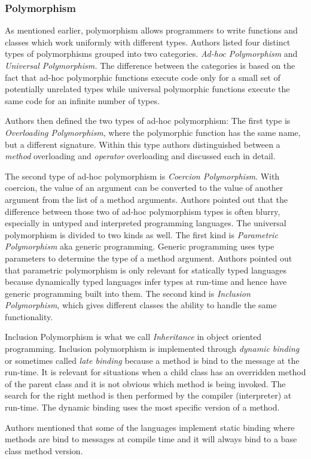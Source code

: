 \documentclass[12pt,twoside,a4paper]{report}
\begin{document}
\subsubsection{Polymorphism}
As mentioned earlier, polymorphism allows programmers to write functions and classes which work uniformly with different types. Authors listed four distinct types of polymorphisms grouped into two categories. \textit{Ad-hoc Polymorphism} and \textit{Universal Polymorphism.} The difference between the categories is based on the fact that ad-hoc polymorphic functions execute code only for a small set of potentially unrelated types while universal polymorphic functions execute the same code for an infinite number of types.\par
Authors then defined the two types of ad-hoc polymorphism: The first type is \textit{Overloading Polymorphism}, where the polymorphic function has the same name, but a different signature. Within this type authors distinguished between a \textit{method} overloading and \textit{operator} overloading and discussed each in detail.\par
The second type of ad-hoc polymorphism is \textit{Coercion Polymorphism}. With coercion, the value of an argument can be converted to the value of another argument from the list of a method arguments. Authors pointed out that the difference between those two of ad-hoc polymorphism types is often blurry, especially in untyped and interpreted programming languages. The universal polymorphism is divided to two kinds as well. The first kind is \textit{Parametric Polymorphism} aka generic programming. Generic programming uses type parameters to determine the type of a method argument. Authors pointed out that parametric polymorphism is only relevant for statically typed languages because dynamically typed languages infer types at run-time and hence have generic programming built into them. The second kind is \textit{Inclusion Polymorphism}, which gives different classes the ability to handle the same functionality.\par
Inclusion Polymorphism is what we call \textit{Inheritance} in object oriented programming. Inclusion polymorphism is implemented through \textit{dynamic binding} or sometimes called \textit{late binding} because a method is bind to the message at the run-time. It is relevant for situations when a child class has an overridden method of the parent class and it is not obvious which method is being invoked. The search for the right method is then performed by the compiler (interpreter) at run-time. The dynamic binding uses the most specific version of a method.\par
Authors mentioned that some of the languages implement static binding where methods are bind to messages at compile time and it will always bind to a base class method version.
\end{document}
